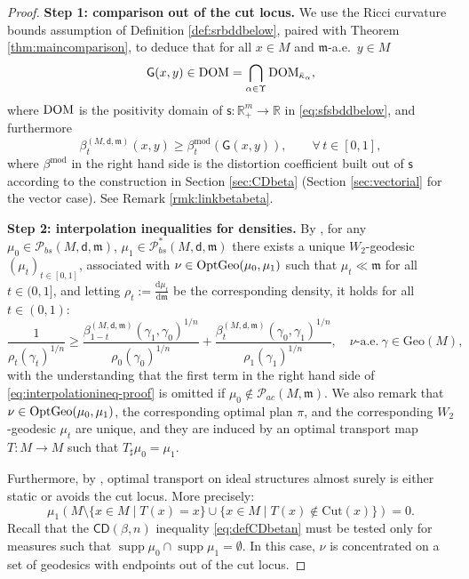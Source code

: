 \documentclass[11pt,a4paper]{article}
\theoremstyle{plain}
\theoremstyle{definition}
\theoremstyle{remark}
\numberwithin{equation}{section}
\newcommand{\R}{\mathbb{R}} %
\newcommand{\Cut}{\mathrm{Cut}}
\newcommand{\DOM}{{\rm{DOM}}}
\DeclareMathOperator{\supp}{\mathrm{supp}}
\newcommand{\CD}{\mathsf{CD}}
\newcommand{\Geo}{\mathrm{Geo}}
\newcommand{\OptGeo}{{\rm OptGeo}}
\newcommand{\sfs}{\mathsf{s}}
\newcommand{\Prob}{\mathcal{P}}
\newcommand{\di}{\mathrm{d}}
\newcommand{\mm}{\mathfrak m}
\newcommand{\sfd}{\mathsf d}
\newcommand{\sfG}{\mathsf G}
\begin{document}
\begin{proof}
\textbf{Step 1: comparison out of the cut locus.} We use the Ricci curvature bounds assumption of Definition \ref{def:srbddbelow}, paired with Theorem \ref{thm:maincomparison}, to deduce that for all $x\in M$ and $\mm$-a.e.\ $y\in M$
\begin{equation}
\sfG(x,y) \in \DOM= \bigcap_{\alpha \in \Upsilon} \DOM_{\bar{\kappa}_\alpha},
\end{equation}
where $\DOM$ is the positivity domain of  $\sfs: \R^m_+ \to \R$ in \eqref{eq:sfsbddbelow}, and furthermore
\begin{equation}\label{eq:comparisonbeta-proof}
\beta_t^{(M,\sfd,\mm)}(x,y) \geq \beta_t^{\mathrm{mod}}(\sfG(x,y)), \qquad \forall\, t\in [0,1],
\end{equation}
where $\beta^{\mathrm{mod}}$ in the right hand side is the distortion coefficient built out of $\sfs$ according to the construction in Section \ref{sec:CDbeta} (Section \ref{sec:vectorial} for the vector case). See Remark \ref{rmk:linkbetabeta}.

\textbf{Step 2: interpolation inequalities for densities.} By \cite[Thm.\@ 4]{BRInv}, for any $\mu_0\in \Prob_{bs}(M,\sfd,\mm)$, $\mu_1 \in \Prob_{bs}^{*}(M,\sfd,\mm)$ there exists a unique $W_2$-geodesic $(\mu_t)_{t\in [0,1]}$, associated with $\nu\in\OptGeo(\mu_0,\mu_1)$ such that $\mu_t\ll \mm$ for all $t\in (0,1]$, and letting $\rho_t:=\tfrac{\di \mu_t}{\di \mm}$ be the corresponding density, it holds for all $t\in (0,1)$:
\begin{equation}\label{eq:interpolationineq-proof}
\frac{1}{\rho_t(\gamma_t)^{1/n}}\geq \frac{\beta_{1-t}^{(M,\sfd,\mm)}(\gamma_1,\gamma_0)^{1/n}}{\rho_0(\gamma_0)^{1/n}} + \frac{\beta_t^{(M,\sfd,\mm)}(\gamma_0,\gamma_1)^{1/n}}{\rho_1(\gamma_1)^{1/n}},\quad \nu\text{-a.e.}\ \gamma \in \Geo(M),
\end{equation}
with the understanding that the first term in the right hand side of \eqref{eq:interpolationineq-proof} is omitted if $\mu_0\notin \mathcal{P}_{ac}(M,\mm)$. We also remark that $\nu\in \OptGeo(\mu_0,\mu_1)$, the corresponding optimal plan $\pi$, and the corresponding $W_2$-geodesic $\mu_t$ are unique, and they are induced by an optimal transport map $T:M\to M$ such that $T_\sharp \mu_0 = \mu_1$.

Furthermore, by \cite[Cor.\ 3.8]{BRInv}, optimal transport on ideal structures almost surely is either static or avoids the cut locus. More precisely:
\begin{equation}
\mu_1\left(M\setminus \{x\in M \mid T(x)=x\} \cup \{x\in M \mid T(x)\notin \Cut(x)\}\right)=0.
\end{equation}
Recall that the $\CD(\beta,n)$ inequality \eqref{eq:defCDbetan} must be tested only for measures such that $\supp\mu_0\cap \supp\mu_1= \emptyset$. In this case, $\nu$ is concentrated on a set of geodesics with endpoints out of the cut locus.


\end{proof}
\end{document}
